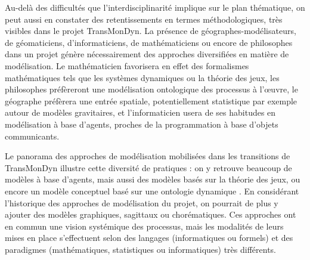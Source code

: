Au-delà des difficultés que l'interdisciplinarité implique sur le plan thématique, on peut aussi en constater des retentissements en termes méthodologiques, très visibles dans le projet TransMonDyn.
La présence de géographes-modélisateurs, de géomaticiens, d'informaticiens, de mathématiciens ou encore de philosophes dans un projet génère nécessairement des approches diversifiées en matière de modélisation.
Le mathématicien favorisera en effet des formalismes mathématiques tels que les systèmes dynamiques ou la théorie des jeux, les philosophes préfèreront une modélisation ontologique des processus à l'œuvre, le géographe préfèrera une entrée spatiale, potentiellement statistique par exemple autour de modèles gravitaires, et l'informaticien usera de ses habitudes en modélisation à base d'agents, proches de la programmation à base d'objets communicants.

Le panorama des approches de modélisation mobilisées dans les transitions de TransMonDyn illustre cette diversité de pratiques :
	on y retrouve beaucoup de modèles à base d'agents, mais aussi des modèles basés sur la théorie des jeux, ou encore un modèle conceptuel basé sur une ontologie dynamique \autocite{favory_transition_2018}.
En considérant l'historique des approches de modélisation du projet, on pourrait de plus y ajouter des modèles graphiques, sagittaux ou chorématiques.
Ces approches ont en commun une vision systémique des processus, mais les modalités de leurs mises en place s'effectuent selon des langages (informatiques ou formels) et des paradigmes (mathématiques, statistiques ou informatiques) très différents.

